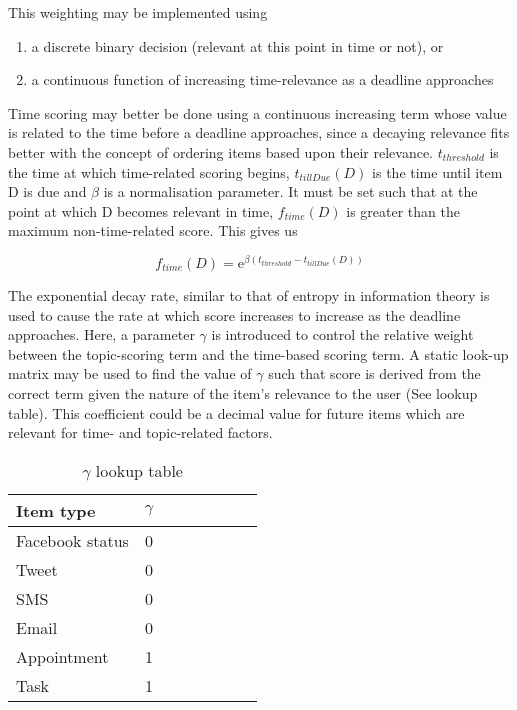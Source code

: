 This weighting may be implemented using 
\begin{enumerate}
  \item a discrete binary decision (relevant at this point in time or not), or 
  \item a continuous function of increasing time-relevance as a deadline approaches
\end{enumerate}

Time scoring may better be done using a continuous increasing term whose value is related to the time before a deadline approaches, since a decaying relevance fits better with the concept of ordering items based upon their relevance. $t_{threshold}$ is the time at which time-related scoring begins, $t_{tillDue}(D)$ is the time until item D is due and $\beta$ is a normalisation parameter. It must be set such that at the point at which D becomes relevant in time, $f_{time}(D)$ is greater than the maximum non-time-related score. This gives us

\begin{equation}\label{BasicTimeScoringRule}
	f_{time} (D) = {\mathrm{e}}^{\beta (t_{threshold}-t_{tillDue}(D))}
\end{equation}

The exponential decay rate, similar to that of entropy in information theory is used to cause the rate at which score increases to increase as the deadline approaches. 
Here, a parameter $\gamma$ is introduced to control the relative weight between the topic-scoring term and the time-based scoring term. A static look-up matrix may be used to find the value of $\gamma$ such that score is derived from the correct term given the nature of the item's relevance to the user (See lookup table). This coefficient could be a decimal value for future items which are relevant for time- and topic-related factors. 

\begin{table}\label{BetaLookup}
\begin{center}
	\begin{tabular}{l*{6}{c}r}
		Item type        & $\gamma$ \\
		\hline
		Facebook status  & 0 \\
		Tweet            & 0 \\
		SMS          	 & 0 \\
		Email    		 & 0 \\
		Appointment      & 1 \\
		Task		     & 1 \\
	\end{tabular}
	\caption{$\gamma$ lookup table}
\end{center}
\end{table}

